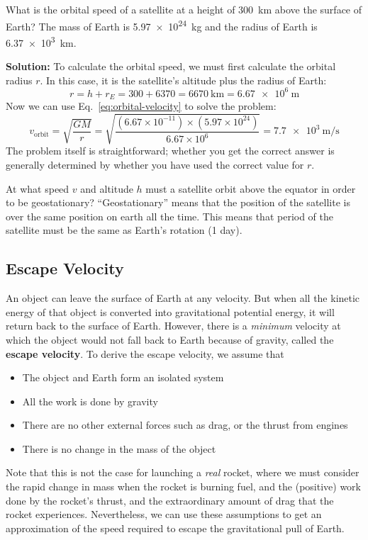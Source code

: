 \begin{example}
  What is the orbital speed of a satellite at a height of
  \SI{300}{\kilo\metre} above the surface of Earth? The mass of Earth is
  \SI{5.97e24}{\kilo\gram} and the radius of Earth is \SI{6.37e3}{\kilo\metre}.

  \textbf{Solution:} To calculate the orbital speed, we must first calculate
  the orbital radius $r$. In this case, it is the satellite's altitude plus
  the radius of Earth:
  \begin{equation*}
    r=h+r_E=300+6370=\SI{6670}{\kilo\metre}=\SI{6.67e6}\metre
  \end{equation*}
  Now we can use Eq.~\ref{eq:orbital-velocity} to solve the problem:
  \begin{equation*}
    v_\text{orbit}=\sqrt{\frac{GM}r}
    =\sqrt{\frac{(6.67\times 10^{-11})\times(5.97\times10^{24})}{6.67\times10^6}}
    =\SI{7.7e3}{\metre\per\second}
  \end{equation*}
  The problem itself is straightforward; whether you get the correct answer
  is generally determined by whether you have used the correct value for $r$.
\end{example}

\begin{example}
  At what speed $v$ and altitude $h$ must a satellite orbit above the equator
  in order to be geostationary? ``Geostationary'' means that the position of
  the satellite is over the same position on earth all the time. This means
  that period of the satellite must be the same as Earth's rotation (1 day).
\end{example}


\subsection{Escape Velocity}
An object can leave the surface of Earth at any velocity. But when all the
kinetic energy of that object is converted into gravitational potential
energy, it will return back to the surface of Earth. However, there is a
\emph{minimum} velocity at which the object would not fall back to Earth
because of gravity, called the \textbf{escape velocity}. To derive the escape
velocity, we assume that
\begin{itemize}[itemsep=2pt]
\item The object and Earth form an isolated system
\item All the work is done by gravity
\item There are no other external forces such as drag, or the thrust from
  engines
\item There is no change in the mass of the object
\end{itemize}
Note that this is not the case for launching a \emph{real} rocket, where we must
consider the rapid change in mass when the rocket is burning fuel, and
the (positive) work done by the rocket's thrust, and the extraordinary amount of
drag that the rocket experiences. Nevertheless, we can use these assumptions to
get an approximation of the speed required to escape the gravitational pull of
Earth.


